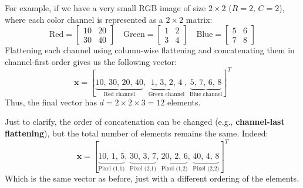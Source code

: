 \highspace
\begin{examplebox}
    For example, if we have a very small RGB image of size $2 \times 2$ ($R=2$, $C=2$), where each color channel is represented as a $2 \times 2$ matrix:
    \begin{equation*}
        \text{Red} = \begin{bmatrix}
            10 & 20 \\
            30 & 40
        \end{bmatrix}
        \quad
        \text{Green} = \begin{bmatrix}
            1 & 2 \\
            3 & 4
        \end{bmatrix}
        \quad
        \text{Blue} = \begin{bmatrix}
            5 & 6 \\
            7 & 8
        \end{bmatrix}
    \end{equation*}
    Flattening each channel using column-wise flattening and concatenating them in channel-first order gives us the following vector:
    \begin{equation*}
        \mathbf{x} = [
            \underbrace{10, \, 30, \, 20, \, 40}_{\text{Red channel}}, \, \underbrace{1, \, 3, \, 2, \, 4}_{\text{Green channel}}, \, \underbrace{5, \, 7, \, 6, \, 8}_{\text{Blue channel}}
        ]^{T}
    \end{equation*}
    Thus, the final vector has $d = 2 \times 2 \times 3 = 12$ elements.

    \highspace
    Just to clarify, the order of concatenation can be changed (e.g., \textbf{channel-last flattening}), but the total number of elements remains the same. Indeed:
    \begin{equation*}
        \mathbf{x} = [
            \underbrace{10, \, 1, \, 5}_{\text{Pixel (1,1)}}, \, \underbrace{30, \, 3, \, 7}_{\text{Pixel (2,1)}}, \, \underbrace{20, \, 2, \, 6}_{\text{Pixel (1,2)}}, \, \underbrace{40, \, 4, \, 8}_{\text{Pixel (2,2)}}
        ]^{T}
    \end{equation*}
    Which is the same vector as before, just with a different ordering of the elements.
\end{examplebox}

